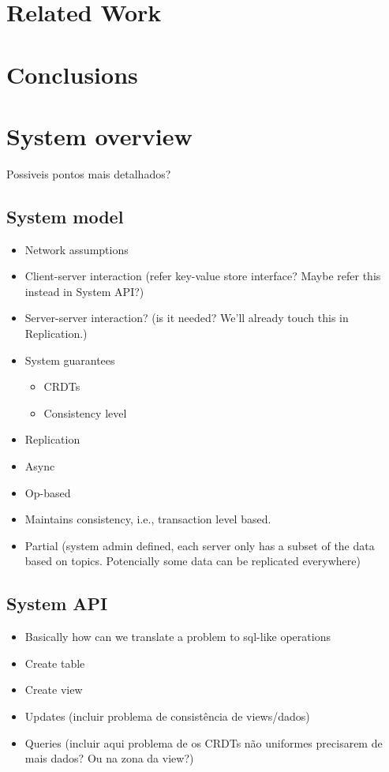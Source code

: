 \documentclass{vldb}
\begin{document}

\section{Related Work}

\section{Conclusions}

\section{System overview}
Possiveis pontos mais detalhados?

\subsection{System model}

\begin{itemize}
	\item Network assumptions
	\item Client-server interaction (refer key-value store interface? Maybe refer this instead in System API?)
	\item Server-server interaction? (is it needed? We'll already touch this in Replication.)
	\item System guarantees
	\begin{itemize}
		\item CRDTs
		\item Consistency level	
	\end{itemize}
	\item Replication
	\item Async
	\item Op-based
	\item Maintains consistency, i.e., transaction level based.
	\item Partial (system admin defined, each server only has a subset of the data based on topics. Potencially some data can be replicated everywhere)
\end{itemize}

\subsection{System API}

\begin{itemize}
	\item Basically how can we translate a problem to sql-like operations
	\item Create table
	\item Create view
	\item Updates (incluir problema de consistência de views/dados)
	\item Queries (incluir aqui problema de os CRDTs não uniformes precisarem de mais dados? Ou na zona da view?)
\end{itemize}
\end{document}
